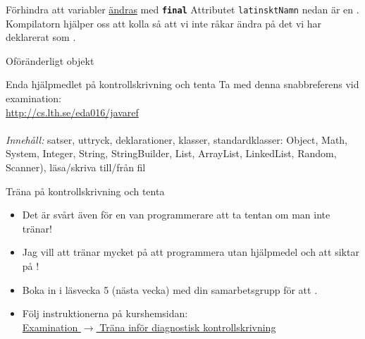 \documentclass{lecturenotes}
\begin{document}
\begin{Slide}{Förhindra att variabler \href{https://docs.oracle.com/javase/tutorial/essential/concurrency/immutable.html}{ändras} med \texttt{\textbf{final}}}
Attributet \texttt{latinsktNamn} nedan är en .\\ Kompilatorn hjälper oss att kolla så att vi inte råkar ändra på det vi har deklarerat som .

\end{Slide}

\begin{Slide}{Oföränderligt objekt}

\end{Slide}

\begin{Slide}{Enda hjälpmedlet på kontrollskrivning och tenta}
Ta med denna snabbreferens  vid examination: \\ 
\url{http://cs.lth.se/eda016/javaref} \\ \vspace{1em}
 \\ \vspace{1em}
\textit{Innehåll:} satser, uttryck, deklarationer, klasser, standardklasser: Object, Math, System, Integer, String, StringBuilder, List, ArrayList, LinkedList, Random, Scanner), läsa/skriva till/från fil  
\end{Slide}

\begin{Slide}{Träna på kontrollskrivning och tenta}
\begin{itemize}
\item Det är svårt även för en van programmerare att ta tentan om man inte tränar!
\item Jag vill att  tränar mycket på att programmera utan hjälpmedel och att  siktar på !
\item Boka in  i läsvecka 5 (nästa vecka) med din samarbetsgrupp för att .
\item Följ instruktionerna på kurshemsidan: \\ \href{http://cs.lth.se/eda016/examination/}{Examination $\rightarrow$ Träna inför diagnostisk kontrollskrivning}
\end{itemize}
\end{Slide}
\end{document}
